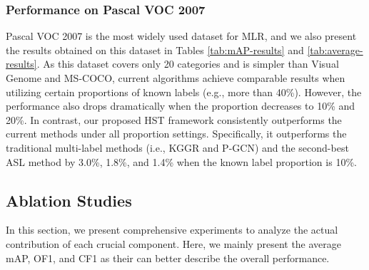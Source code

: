 \subsubsection{Performance on Pascal VOC 2007}
Pascal VOC 2007 is the most widely used dataset for MLR, and we also present the results obtained on this dataset in Tables \ref{tab:mAP-results} and \ref{tab:average-results}. As this dataset covers only 20 categories and is simpler than Visual Genome and MS-COCO, current algorithms achieve comparable results when utilizing certain proportions of known labels (e.g., more than 40\%). However, the performance also drops dramatically when the proportion decreases to 10\% and 20\%. In contrast, our proposed HST framework consistently outperforms the current methods under all proportion settings. Specifically, it outperforms the traditional multi-label methods (i.e., KGGR and P-GCN) and the second-best ASL method by 3.0\%, 1.8\%, and 1.4\% when the known label proportion is 10\%.



\subsection{Ablation Studies}
In this section, we present comprehensive experiments to analyze the actual contribution of each crucial component. Here, we mainly present the average mAP, OF1, and CF1 as their can better describe the overall performance. 

